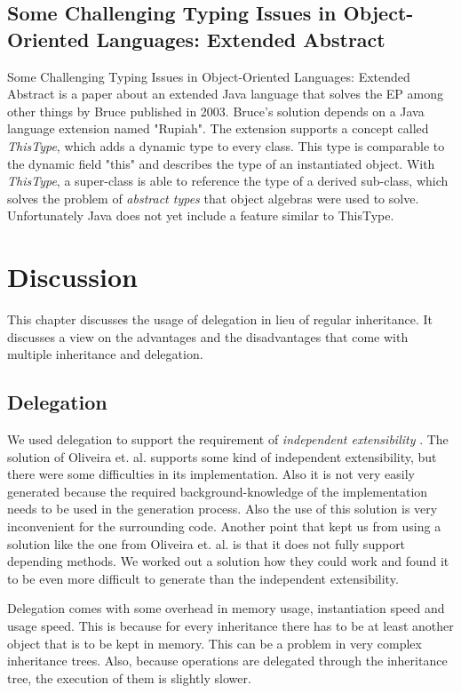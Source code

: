 \documentclass{report}
\begin{document}
\subsection*{Some Challenging Typing Issues in Object-Oriented Languages: Extended Abstract}

{Some Challenging Typing Issues in Object-Oriented Languages: Extended Abstract} is a paper about an extended Java language that solves the EP among other things by Bruce published in 2003\cite{Bruce-Typing-2003}.
Bruce's solution depends on a Java language extension named "Rupiah"\cite{Foster-Rupiah-2001}. The extension supports a concept called \emph{ThisType}, which adds a dynamic type to every class. This type is comparable to the dynamic field "this" and describes the type of an instantiated object. With \emph{ThisType}, a super-class is able to reference the type of a derived sub-class, which solves the problem of \emph{abstract types} that object algebras were used to solve. Unfortunately Java does not yet include a feature similar to ThisType.

\section{Discussion}

This chapter discusses the usage of delegation in lieu of regular inheritance. It discusses a view on the advantages and the disadvantages that come with multiple inheritance and delegation.

\subsection{Delegation}
We used delegation to support the requirement of \emph{independent extensibility} \cite{Odersky-Expression-2005, Oliv-Extensibility-2012}. The solution of Oliveira et. al. supports some kind of independent extensibility, but there were some difficulties in its implementation. Also it is not very easily generated because the required background-knowledge of the implementation needs to be used in the generation process. Also the use of this solution is very inconvenient for the surrounding code. Another point that kept us from using a solution like the one from Oliveira et. al. is that it does not fully support depending methods. We worked out a solution how they could work and found it to be even more difficult to generate than the independent extensibility.

Delegation comes with some overhead in memory usage, instantiation speed and usage speed. This is because for every inheritance there has to be at least another object that is to be kept in memory. This can be a problem in very complex inheritance trees. Also, because operations are delegated through the inheritance tree, the execution of them is slightly slower.
\end{document}
